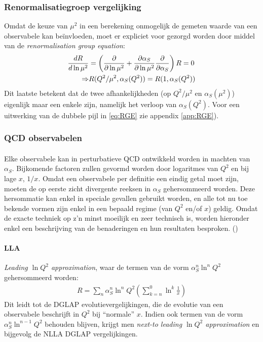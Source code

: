 \documentclass[a4paper,11pt]{article}
\numberwithin{equation}{section} %
\begin{document}
    \subsubsection{Renormalisatiegroep vergelijking}
Omdat de keuze van $\mu^2$ in een berekening onmogelijk de gemeten waarde van een observabele kan beïnvloeden, moet er expliciet voor gezorgd worden door middel van de \textit{renormalisation group equation}:
\begin{align} \label{eq:RGE}
\frac{d R}{d\ln{\mu^2}} &= \left(\frac{\partial}{\partial \ln{\mu^2}} + \frac{\partial \alpha_S}{\partial \ln{\mu^2}} \frac{\partial}{\partial \alpha_S} \right) R = 0 \\
\Rightarrow &R(Q^2/\mu^2, \alpha_S(Q^2)) = R(1,\alpha_S(Q^2)) \notag
\end{align}
Dit laatste betekent dat de twee afhankelijkheden (op $Q^2/\mu^2$ en $\alpha_S(\mu^2)$) eigenlijk maar een enkele zijn, namelijk het verloop van $\alpha_S(Q^2)$. Voor een uitwerking van de dubbele pijl in \eqref{eq:RGE} zie appendix \ref{app:RGE}).

    \subsubsection{QCD observabelen} \label{sec:Observabelen}
      \paragraph{}
Elke observabele kan in perturbatieve QCD ontwikkeld worden in machten van $\alpha_S$.
Bijkomende factoren zullen gevormd worden door logaritmes van $Q^2$ en bij lage $x$, $1/x$.
Omdat een observabele per definitie een eindig getal moet zijn, moeten de op eerste zicht divergente reeksen in $\alpha_S$ gehersommeerd worden.
Deze hersommatie kan enkel in speciale gevallen gebruikt worden, en alle tot nu toe bekende vormen zijn enkel in een bepaald regime (van $Q^2$ en/of $x$) geldig.
Omdat de exacte techniek op z’n minst moeilijk en zeer technisch is, worden hieronder enkel een beschrijving van de benaderingen en hun resultaten besproken. (\cite[sectie 9.5.2]{Barone})

      \paragraph{LLA}
\textit{Leading $\ln{Q^2}$ approximation}, waar de termen van de vorm $\alpha_S^n \ln^n{Q^2}$ gehersommeerd worden:
\begin{align} \label{eq:LLA}
R = \sum_n \alpha_S^n \ln^n{Q^2} \left( \sum_{k=n}^0 \ln^k{\frac{1}{x}} \right)
\end{align}
Dit leidt tot de DGLAP evolutievergelijkingen, die de evolutie van een observabele beschrijft in $Q^2$ bij “normale” $x$.
Indien ook termen van de vorm $\alpha_S^n \ln^{n-1}{Q^2}$ behouden blijven, krijgt men \textit{next-to leading $\ln{Q^2}$ approximation} en bijgevolg de NLLA DGLAP vergelijkingen.
\end{document}
